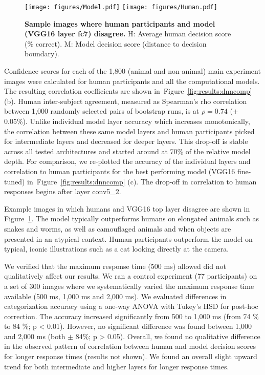 \documentclass{article}
\begin{document}
\begin{figure}[t!]
  \begin{center}
    \texttt{[image: figures/Model.pdf]}
    \texttt{[image: figures/Human.pdf]}
    \caption[Humans versus model disagreement example images]{\textbf{Sample images where human participants and model (VGG16 layer fc7) disagree.} H: Average human decision score (\% correct). M: Model decision score (distance to decision boundary).}
    \label{fig:results:exampleimg}
  \end{center}
\end{figure}


Confidence scores for each of the 1,800 (animal and non-animal) main experiment images were calculated for human participants and all the computational models. The resulting correlation coefficients are shown in~Figure~\ref{fig:results:dnncomp} (b). Human inter-subject agreement, measured as Spearman's rho correlation between 1,000 randomly selected pairs of bootstrap runs, is at $\rho=0.74$ ($\pm$ 0.05\%). Unlike individual model layer accuracy which increases monotonically, the correlation between these same model layers and human participants picked for intermediate layers and decreased for deeper layers. This drop-off is stable across all tested architectures and started around at 70\% of the relative model depth. For comparison, we re-plotted the accuracy of the individual layers and correlation to human participants for the  best performing model (VGG16 fine-tuned) in~Figure~\ref{fig:results:dnncomp} (c). The drop-off in correlation to human responses begins after layer conv5\_2.




Example images in which humans and VGG16 top layer disagree are shown in Figure~\ref{fig:results:exampleimg}. The model typically outperforms humans on elongated animals such as snakes and worms, as well as camouflaged animals and when objects are presented in an atypical context. Human participants outperform the model on typical, iconic illustrations such as a cat looking directly at the camera.




We verified that the maximum response time (500 ms) allowed did not qualitatively affect our results. We  ran a  control experiment (77 participants) on a set of 300 images where we systematically varied the maximum response time available (500 ms, 1,000 ms and 2,000 ms). We evaluated differences in categorization accuracy using a one-way ANOVA with Tukey's HSD for post-hoc correction. The accuracy increased significantly from 500 to 1,000 ms (from 74 \% to 84 \%; p < 0.01). However, no significant difference was found between 1,000 and 2,000 ms (both $\pm$ 84\%; p > 0.05). Overall, we found no qualitative difference in the observed pattern of correlation between human and model decision scores for longer response times (results not shown). We found an overall slight upward trend for both intermediate and higher layers for longer response times.
\end{document}
